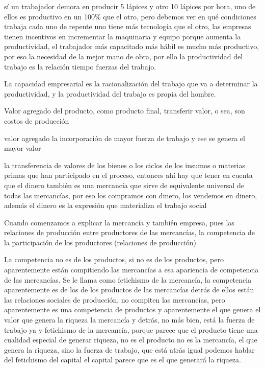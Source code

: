\documentclass[
  letterpaper,
  DIV=11,
  numbers=noendperiod]{scrartcl}
\begin{document}
sí un trabajador demora en producir 5 lápices y otro 10 lápices por
hora, uno de ellos es productivo en un 100\% que el otro, pero debemos
ver en qué condiciones trabaja cada uno de repente uno tiene más
tecnología que el otro, las empresas tienen incentivos en incrementar la
maquinaria y equipo porque aumenta la productividad, el trabajador más
capacitado más hábil es mucho más productivo, por eso la necesidad de la
mejor mano de obra, por ello la productividad del trabajo es la relación
tiempo fuerzas del trabajo.

La capacidad empresarial es la racionalización del trabajo que va a
determinar la productividad, y la productividad del trabajo es propia
del hombre.

Valor agregado del producto, como producto final, transferir valor, o
sea, son costos de producción

valor agregado la incorporación de mayor fuerza de trabajo y ese se
genera el mayor valor

la transferencia de valores de los bienes o los ciclos de los insumos o
materias primas que han participado en el proceso, entonces ahí hay que
tener en cuenta que el dinero también es una mercancía que sirve de
equivalente universal de todas las mercancías, por eso los compramos con
dinero, los vendemos en dinero, además el dinero es la expresión que
materializa el trabajo social

Cuando comenzamos a explicar la mercancía y también empresa, pues las
relaciones de producción entre productores de las mercancías, la
competencia de la participación de los productores (relaciones de
producción)

La competencia no es de los productos, si no es de los productos, pero
aparentemente están compitiendo las mercancías a esa apariencia de
competencia de las mercancías. Se le llama como fetichismo de la
mercancía, la competencia aparentemente es de los de los productos de
las mercancías detrás de ellos están las relaciones sociales de
producción, no compiten las mercancías, pero aparentemente es una
competencia de productos y aparentemente el que genera el valor que
genera la riqueza la mercancía y detrás, no más bien, está la fuerza de
trabajo ya y fetichismo de la mercancía, porque parece que el producto
tiene una cualidad especial de generar riqueza, no es el producto no es
la mercancía, el que genera la riqueza, sino la fuerza de trabajo, que
está atrás igual podemos hablar del fetichismo del capital el capital
parece que es el que generará la riqueza.
\end{document}
